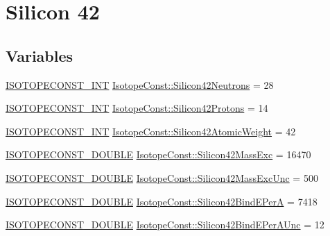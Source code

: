 \hypertarget{group___isotope_const-_silicon-_si42}{}\section{Silicon 42}
\label{group___isotope_const-_silicon-_si42}
\subsection*{Variables}
\begin{DoxyCompactItemize}
\item 
\mbox{\hyperlink{group___isotope_const-_macros_ga5f18360b3e99483a35c32d789e62621c}{I\+S\+O\+T\+O\+P\+E\+C\+O\+N\+S\+T\+\_\+\+I\+NT}} \mbox{\hyperlink{group___isotope_const-_silicon-_si42_ga19a35bf1323201a7d6ead92edcd1872e}{Isotope\+Const\+::\+Silicon42\+Neutrons}} = 28
\item 
\mbox{\hyperlink{group___isotope_const-_macros_ga5f18360b3e99483a35c32d789e62621c}{I\+S\+O\+T\+O\+P\+E\+C\+O\+N\+S\+T\+\_\+\+I\+NT}} \mbox{\hyperlink{group___isotope_const-_silicon-_si42_ga8386291d226b045ae9c04ed79b6af5a9}{Isotope\+Const\+::\+Silicon42\+Protons}} = 14
\item 
\mbox{\hyperlink{group___isotope_const-_macros_ga5f18360b3e99483a35c32d789e62621c}{I\+S\+O\+T\+O\+P\+E\+C\+O\+N\+S\+T\+\_\+\+I\+NT}} \mbox{\hyperlink{group___isotope_const-_silicon-_si42_ga00e9627f4c1e266b69361d1e3fd3bba4}{Isotope\+Const\+::\+Silicon42\+Atomic\+Weight}} = 42
\item 
\mbox{\hyperlink{group___isotope_const-_macros_ga8f45a7272ce02c0b4c65c44636ed719a}{I\+S\+O\+T\+O\+P\+E\+C\+O\+N\+S\+T\+\_\+\+D\+O\+U\+B\+LE}} \mbox{\hyperlink{group___isotope_const-_silicon-_si42_ga8a8ca6c3515808de191f55a1fc9efcdb}{Isotope\+Const\+::\+Silicon42\+Mass\+Exc}} = 16470
\item 
\mbox{\hyperlink{group___isotope_const-_macros_ga8f45a7272ce02c0b4c65c44636ed719a}{I\+S\+O\+T\+O\+P\+E\+C\+O\+N\+S\+T\+\_\+\+D\+O\+U\+B\+LE}} \mbox{\hyperlink{group___isotope_const-_silicon-_si42_gabf826fd7c046cb094780c444d3e8788a}{Isotope\+Const\+::\+Silicon42\+Mass\+Exc\+Unc}} = 500
\item 
\mbox{\hyperlink{group___isotope_const-_macros_ga8f45a7272ce02c0b4c65c44636ed719a}{I\+S\+O\+T\+O\+P\+E\+C\+O\+N\+S\+T\+\_\+\+D\+O\+U\+B\+LE}} \mbox{\hyperlink{group___isotope_const-_silicon-_si42_gaa89208e1bd65c013e9e6aed0b7f401f3}{Isotope\+Const\+::\+Silicon42\+Bind\+E\+PerA}} = 7418
\item 
\mbox{\hyperlink{group___isotope_const-_macros_ga8f45a7272ce02c0b4c65c44636ed719a}{I\+S\+O\+T\+O\+P\+E\+C\+O\+N\+S\+T\+\_\+\+D\+O\+U\+B\+LE}} \mbox{\hyperlink{group___isotope_const-_silicon-_si42_gae9a4323166a7056ccc8409cc725c84c4}{Isotope\+Const\+::\+Silicon42\+Bind\+E\+Per\+A\+Unc}} = 12

\end{DoxyCompactItemize}
